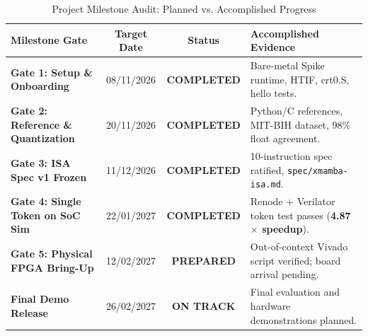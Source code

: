\documentclass[11pt,a4paper,oneside]{report}
\begin{document}
\begin{table}[!htbp]
\caption[Project Milestone Audit: Planned vs. Accomplished Progress]{Project Milestone Audit: Planned vs. Accomplished Progress}
\label{tab:milestone_audit}
\centering
\begin{tabularx}{\linewidth}{>{\raggedright\arraybackslash\bfseries}p{2.6cm}ccl}
\toprule
\textbf{Milestone Gate} & \textbf{Target Date} & \textbf{Status} & \textbf{Accomplished Evidence} \\
\midrule
Gate 1: Setup \& Onboarding & 08/11/2026 & \textbf{COMPLETED} & Bare-metal Spike runtime, HTIF, crt0.S, hello tests. \\
Gate 2: Reference \& Quantization & 20/11/2026 & \textbf{COMPLETED} & Python/C references, MIT-BIH dataset, 98\% float agreement. \\
Gate 3: ISA Spec v1 Frozen & 11/12/2026 & \textbf{COMPLETED} & 10-instruction spec ratified, \texttt{spec/xmamba-isa.md}. \\
Gate 4: Single Token on SoC Sim & 22/01/2027 & \textbf{COMPLETED} & Renode + Verilator token test passes (\textbf{4.87$\times$ speedup}). \\
Gate 5: Physical FPGA Bring-Up & 12/02/2027 & \textbf{PREPARED} & Out-of-context Vivado script verified; board arrival pending. \\
Final Demo Release & 26/02/2027 & \textbf{ON TRACK} & Final evaluation and hardware demonstrations planned. \\
\bottomrule
\end{tabularx}
\end{table}
\end{document}
